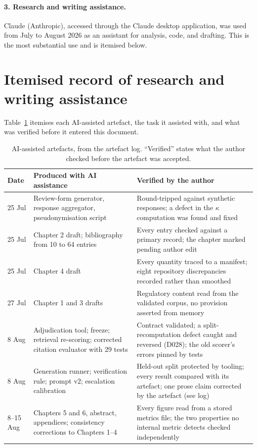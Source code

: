 \paragraph{3. Research and writing assistance.} Claude (Anthropic), accessed
through the Claude desktop application, was used from July to August 2026 as an
assistant for analysis, code, and drafting. This is the most substantial use and
is itemised below.

\section{Itemised record of research and writing assistance}

Table~\ref{tab:ai-use} itemises each AI-assisted artefact, the task it assisted with, and what was verified before it entered this document.

\begin{table}[htbp]
  \centering
  \caption{AI-assisted artefacts, from the artefact log. ``Verified'' states what the author checked before the artefact was accepted.}
  \label{tab:ai-use}
  \footnotesize
  \begin{tabularx}{\textwidth}{@{}l X X@{}}
    \toprule
    \textbf{Date} & \textbf{Produced with AI assistance} & \textbf{Verified by the author} \\
    \midrule
    25 Jul & Review-form generator, response aggregator, pseudonymisation script & Round-tripped against synthetic responses; a defect in the $\kappa$ computation was found and fixed \\
    25 Jul & Chapter 2 draft; bibliography from 10 to 64 entries & Every entry checked against a primary record; the chapter marked pending author edit \\
    25 Jul & Chapter 4 draft & Every quantity traced to a manifest; eight repository discrepancies recorded rather than smoothed \\
    27 Jul & Chapter 1 and 3 drafts & Regulatory content read from the validated corpus, no provision asserted from memory \\
    8 Aug & Adjudication tool; freeze; retrieval re-scoring; corrected citation evaluator with 29 tests & Contract validated; a split-recomputation defect caught and reversed (D028); the old scorer's errors pinned by tests \\
    8 Aug & Generation runner; verification rule; prompt v2; escalation calibration & Held-out split protected by tooling; every result compared with its artefact; one prose claim corrected by the artefact (see log) \\
    8--15 Aug & Chapters 5 and 6, abstract, appendices; consistency corrections to Chapters 1--4 & Every figure read from a stored metrics file; the two properties no internal metric detects checked independently \\
    \bottomrule
  \end{tabularx}
\end{table}

